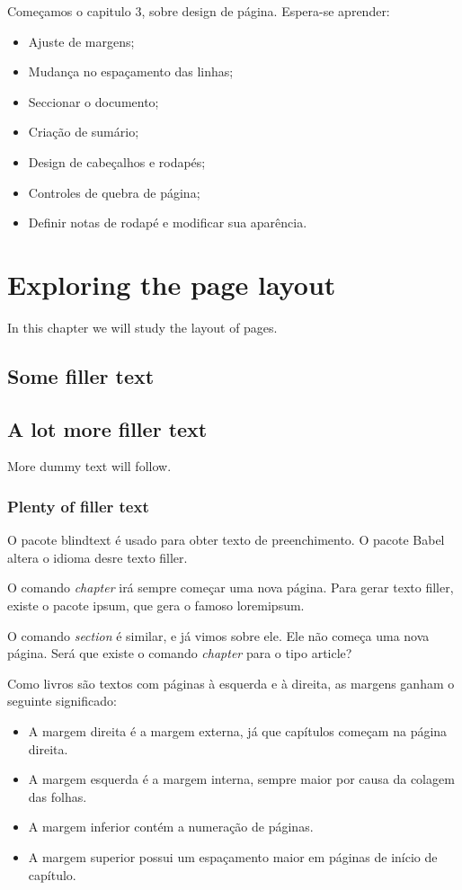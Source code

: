 \documentclass[a4paper, 12pts]{book}
\begin{document}
Começamos o capitulo 3, sobre design de página.
Espera-se aprender:
\begin{itemize}
    \item Ajuste de margens;
    \item Mudança no espaçamento das linhas;
    \item Seccionar o documento;
    \item Criação de sumário;
    \item Design de cabeçalhos e rodapés;
    \item Controles de quebra de página;
    \item Definir notas de rodapé e modificar sua aparência.
\end{itemize}

\chapter{Exploring the page layout}
In this chapter we will study the layout of pages.

\section{Some filler text}
\blindtext
\section{A lot more filler text}
More dummy text will follow.
\subsection{Plenty of filler text}
\blindtext[10]

O pacote blindtext é usado para obter texto de preenchimento.
O pacote Babel altera o idioma desre texto filler.

O comando \emph{chapter} irá sempre começar uma nova página.
Para gerar texto filler, existe o pacote ipsum, que gera o famoso loremipsum.

O comando \emph{section} é similar, e já vimos sobre ele. Ele não começa uma nova página. Será que existe o comando \emph{chapter} para o tipo article?

Como livros são textos com páginas à esquerda e à direita, as margens ganham o seguinte significado:

\begin{itemize}
    \item A margem direita é a margem externa, já que capítulos começam na página direita.
    \item A margem esquerda é a margem interna, sempre maior por causa da colagem das folhas.
    \item A margem inferior contém a numeração de páginas.
    \item A margem superior possui um espaçamento maior em páginas de início de capítulo.
\end{itemize}
\end{document}
